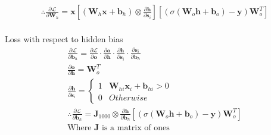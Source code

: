 \documentclass[12pt]{article}
\begin{document}
\begin{description}
\begin{equation}
\begin{aligned}
            \therefore \frac{\partial \mathcal{L}}{\partial \mathbf{W}_h} = \mathbf{x} [(\mathbf{W}_{h} \mathbf{x} + \mathbf{b}_{h}) \otimes \frac{\partial \mathbf{h}}{\partial \mathbf{s}_i}] [(\sigma (\mathbf{W}_{o} \mathbf{h} + \mathbf{b}_o) - \mathbf{y}) \mathbf{W}_o^T]         \\
          \end{aligned}
        \end{equation}
  \item{Loss with respect to hidden bias}
        \begin{equation}
          \begin{aligned}
            \frac{\partial \mathcal{L}}{\partial \mathbf{b}_h} = \frac{\partial \mathcal{L}}{\partial \mathbf{o}} \cdot \frac{\partial \mathbf{o}}{\partial \mathbf{h}} \cdot \frac{\partial \mathbf{h}}{\partial \mathbf{s}_i} \cdot \frac{\partial \mathbf{s}_i}{\partial \mathbf{b}_h} \\
            \frac{\partial \mathbf{o}}{\partial \mathbf{h}} = \mathbf{W}_o^T                                                                                                                                                                                                              \\
            \frac{\partial \mathbf{h}}{\partial \mathbf{s}_i} = \begin{cases}
              1 & \mathbf{W}_{hi} \mathbf{x}_i + \mathbf{b}_{hi} > 0 \\
              0 & Otherwise
            \end{cases}                                                                                                                                                                                                 \\
            \therefore \frac{\partial \mathcal{L}}{\partial \mathbf{b}_h} = \mathbf{J}_{1000} \otimes \frac{\partial \mathbf{h}}{\partial \mathbf{b}_h} [(\sigma (\mathbf{W}_{o} \mathbf{h} + \mathbf{b}_o) - \mathbf{y}) \mathbf{W}_o^T]                                                 \\
            \textrm{Where } \mathbf{J} \textrm{ is a matrix of ones}                                                                                                                                                                                                                      \\
          \end{aligned}
        \end{equation}
\end{description}
\end{document}
